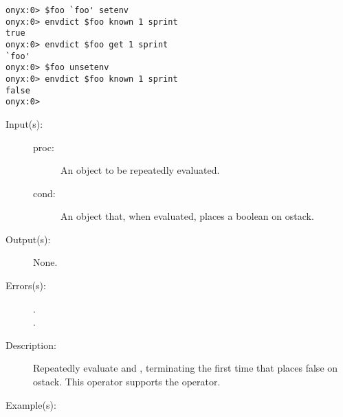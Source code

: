 \begin{description}
\begin{description}
\begin{verbatim}
onyx:0> $foo `foo' setenv
onyx:0> envdict $foo known 1 sprint
true
onyx:0> envdict $foo get 1 sprint
`foo'
onyx:0> $foo unsetenv
onyx:0> envdict $foo known 1 sprint
false
onyx:0>
		\end{verbatim}
	\end{description}
\label{systemdict:until}
\item[{\onyxop{proc cond}{until}{--}}: ]
	\begin{description}\item[]
	\item[Input(s): ]
		\begin{description}\item[]
		\item[proc: ]
			An object to be repeatedly evaluated.
		\item[cond: ]
			An object that, when evaluated, places a boolean on
			ostack.
		\end{description}
	\item[Output(s): ] None.
	\item[Errors(s): ]
		\begin{description}\item[]
		\item[.]
		\item[.]
		\end{description}
	\item[Description: ]
		Repeatedly evaluate  and , terminating
		the first time that  places false on ostack.  This
		operator supports the
		 operator.
	\item[Example(s): ]\begin{verbatim}


\end{verbatim}
\end{description}
\end{description}
